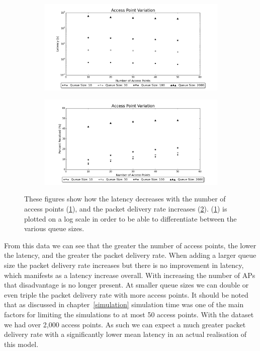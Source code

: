         \begin{figure}
            \centering
            \begin{subfigure}{0.8\textwidth}
                \centering
                \includegraphics[width=\linewidth]{./images/Access_Point_Latency.png}
                \caption{}
                \label{fig:num_aps_latency}
            \end{subfigure}
            \begin{subfigure}{0.8\textwidth}
                \includegraphics[width=\linewidth]{./images/Access_Point_Received.png}
                \caption{}
                \label{fig:num_aps_received}
            \end{subfigure}
            \caption{These figures show how the latency decreases with the number of access points (\ref{fig:num_aps_latency}), and the packet delivery rate increases (\ref{fig:num_aps_received}). (\ref{fig:num_aps_latency}) is plotted on a log scale in order to be able to differentiate between the various queue sizes.}
            \label{fig:num_aps}
        \end{figure}

        From this data we can see that the greater the number of access points, the lower the latency, and the greater the packet delivery rate. When adding a larger queue size the packet delivery rate increases but there is no improvement in latency, which manifests as a latency increase overall. With increasing the number of APs that disadvantage is no longer present. At smaller queue sizes we can double or even triple the packet delivery rate with more access points. It should be noted that as discussed in chapter~\ref{simulation} simulation time was one of the main factors for limiting the simulations to at most 50 access points. With the dataset we had over 2,000 access points. As such we can expect a much greater packet delivery rate with a significantly lower mean latency in an actual realisation of this model. 


